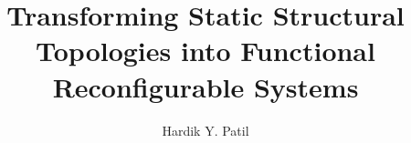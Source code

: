 \documentclass{dissertation}
\title{Transforming Static Structural Topologies into Functional Reconfigurable Systems}
\author{Hardik Y. Patil}
\begin{document}
\setlength{\parskip}{1\baselineskip}
\doublespacing{}







\appendix{



}

\nocite{*}


\end{document}
